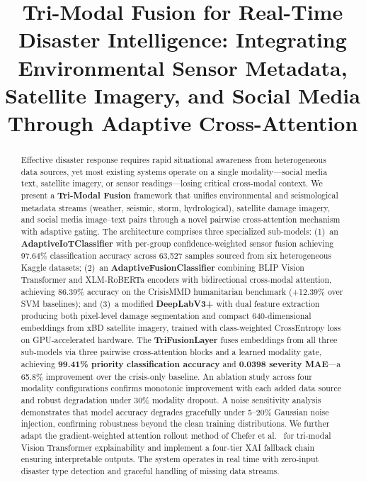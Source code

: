 \documentclass[journal]{IEEEtran}
\begin{document}
\title{Tri-Modal Fusion for Real-Time Disaster Intelligence: Integrating Environmental Sensor Metadata, Satellite Imagery, and Social Media Through Adaptive Cross-Attention}

\author{
}

\maketitle

\begin{abstract}
Effective disaster response requires rapid situational awareness from heterogeneous data sources, yet most existing systems operate on a single modality---social media text, satellite imagery, or sensor readings---losing critical cross-modal context. We present a \textbf{Tri-Modal Fusion} framework that unifies environmental and seismological metadata streams (weather, seismic, storm, hydrological), satellite damage imagery, and social media image--text pairs through a novel pairwise cross-attention mechanism with adaptive gating. The architecture comprises three specialized sub-models: (1)~an \textbf{AdaptiveIoTClassifier} with per-group confidence-weighted sensor fusion achieving 97.64\% classification accuracy across 63,527 samples sourced from six heterogeneous Kaggle datasets; (2)~an \textbf{AdaptiveFusionClassifier} combining BLIP Vision Transformer and XLM-RoBERTa encoders with bidirectional cross-modal attention, achieving 86.39\% accuracy on the CrisisMMD humanitarian benchmark (+12.39\% over SVM baselines); and (3)~a modified \textbf{DeepLabV3+} with dual feature extraction producing both pixel-level damage segmentation and compact 640-dimensional embeddings from xBD satellite imagery, trained with class-weighted CrossEntropy loss on GPU-accelerated hardware. The \textbf{TriFusionLayer} fuses embeddings from all three sub-models via three pairwise cross-attention blocks and a learned modality gate, achieving \textbf{99.41\% priority classification accuracy} and \textbf{0.0398 severity MAE}---a 65.8\% improvement over the crisis-only baseline. An ablation study across four modality configurations confirms monotonic improvement with each added data source and robust degradation under 30\% modality dropout. A noise sensitivity analysis demonstrates that model accuracy degrades gracefully under 5--20\% Gaussian noise injection, confirming robustness beyond the clean training distributions. We further adapt the gradient-weighted attention rollout method of Chefer et al.~\cite{chefer2021transformer} for tri-modal Vision Transformer explainability and implement a four-tier XAI fallback chain ensuring interpretable outputs. The system operates in real time with zero-input disaster type detection and graceful handling of missing data streams.
\end{abstract}
\end{document}
